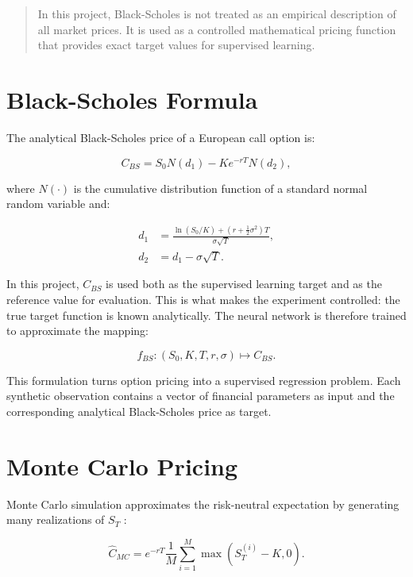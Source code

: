 \begin{quote}
    In this project, Black-Scholes is not treated as an empirical description of all market prices.
    It is used as a controlled mathematical pricing function that provides exact target values for supervised learning.
\end{quote}

\section{Black-Scholes Formula}

The analytical Black-Scholes price of a European call option is:

\begin{equation}
    C_{BS} = S_0 N(d_1) - K e^{-rT} N(d_2),
\end{equation}

where $N(\cdot)$ is the cumulative distribution function of a standard normal random variable and:

\begin{align}
    d_1 & = \frac{\ln(S_0/K) + \left(r + \frac{1}{2}\sigma^2\right)T}{\sigma\sqrt{T}}, \\
    d_2 & = d_1 - \sigma\sqrt{T}.
\end{align}

In this project, $C_{BS}$ is used both as the supervised learning target and as the reference value for evaluation.
This is what makes the experiment controlled: the true target function is known analytically.
The neural network is therefore trained to approximate the mapping:

\begin{equation}
    f_{BS}: (S_0, K, T, r, \sigma) \longmapsto C_{BS}.
\end{equation}

This formulation turns option pricing into a supervised regression problem.
Each synthetic observation contains a vector of financial parameters as input and the corresponding analytical Black-Scholes price as target.

\section{Monte Carlo Pricing}

Monte Carlo simulation approximates the risk-neutral expectation by generating many realizations of $S_T$ \cite{glasserman2004monte}:

\begin{equation}
    \hat{C}_{MC} =
    e^{-rT}
    \frac{1}{M}
    \sum_{i=1}^{M}
    \max(S_T^{(i)} - K, 0).
\end{equation}

